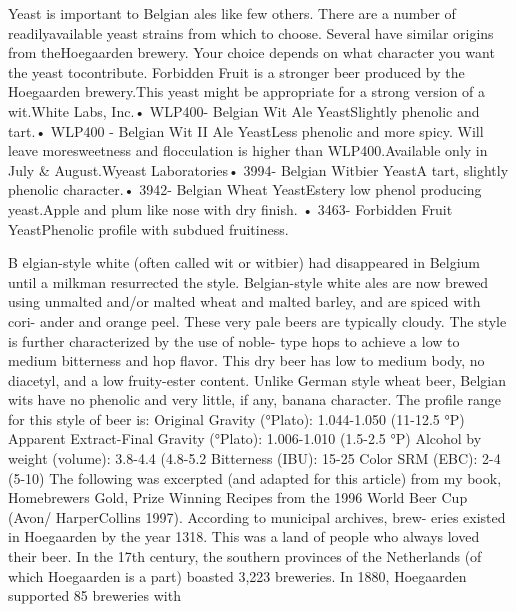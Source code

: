 \documentclass[a4paper,parskip=half]{scrartcl}
\begin{document}
Yeast is important to Belgian ales like few others.  There are a number of readilyavailable yeast strains from which to choose.  Several have similar origins from theHoegaarden brewery.  Your choice depends on what character you want the yeast tocontribute.  Forbidden Fruit is a stronger beer produced by the Hoegaarden brewery.This yeast might be appropriate for a strong version of a wit.White Labs, Inc.• WLP400- Belgian Wit Ale YeastSlightly phenolic and tart.• WLP400 - Belgian Wit II Ale YeastLess phenolic and more spicy. Will leave moresweetness and flocculation is higher than WLP400.Available only in July \& August.Wyeast Laboratories• 3994- Belgian Witbier YeastA tart, slightly phenolic character.• 3942- Belgian Wheat YeastEstery low phenol producing yeast.Apple and plum like nose with dry finish. • 3463- Forbidden Fruit YeastPhenolic profile with subdued fruitiness.

\parencite[52]{Papazian2011}
B
elgian-style white (often called wit or
witbier) had disappeared in Belgium
until a milkman resurrected the style.
Belgian-style white ales are now brewed
using unmalted and/or malted wheat and
malted barley, and are spiced with cori-
ander and orange peel. These very pale
beers are typically cloudy. The style is
further characterized by the use of noble-
type hops to achieve a low to medium
bitterness and hop flavor. This dry beer
has low to medium body, no diacetyl,
and a low fruity-ester content. Unlike
German style wheat beer, Belgian wits
have no phenolic and very little, if any,
banana character. The profile range for
this style of beer is:
Original Gravity (°Plato): 1.044-1.050
(11-12.5 °P)
Apparent Extract-Final Gravity (°Plato):
1.006-1.010 (1.5-2.5 °P)
Alcohol by weight (volume): 3.8-4.4%
(4.8-5.2%
Bitterness (IBU): 15-25
Color SRM (EBC): 2-4 (5-10)
The following was excerpted (and
adapted for this article) from my book,
Homebrewers Gold, Prize Winning Recipes
from the 1996 World Beer Cup (Avon/
HarperCollins 1997).
According to municipal archives, brew-
eries existed in Hoegaarden by the year
1318. This was a land of people who
always loved their beer. In the 17th
century, the southern provinces of the
Netherlands (of which Hoegaarden is a
part) boasted 3,223 breweries. In 1880,
Hoegaarden supported 85 breweries with

\parencite[53]{Papazian2011}
\end{document}
